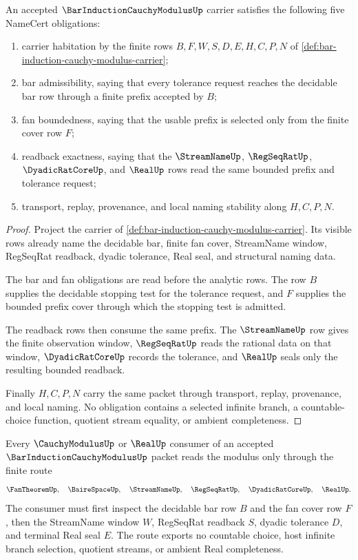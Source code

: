 \begin{theorem}
\label{thm:bar-induction-cauchy-modulus-obligations}
An accepted $\BarInductionCauchyModulusUp$ carrier satisfies the following five NameCert obligations:
\begin{enumerate}
\item carrier habitation by the finite rows $B,F,W,S,D,E,H,C,P,N$ of \autoref{def:bar-induction-cauchy-modulus-carrier};
\item bar admissibility, saying that every tolerance request reaches the decidable bar row through a finite prefix accepted by $B$;
\item fan boundedness, saying that the usable prefix is selected only from the finite cover row $F$;
\item readback exactness, saying that the $\StreamNameUp$, $\RegSeqRatUp$, $\DyadicRatCoreUp$, and $\RealUp$ rows read the same bounded prefix and tolerance request;
\item transport, replay, provenance, and local naming stability along $H,C,P,N$.
\end{enumerate}
\end{theorem}

\begin{proof}
Project the carrier of \autoref{def:bar-induction-cauchy-modulus-carrier}. Its visible rows already name the decidable bar, finite fan cover, StreamName window, RegSeqRat readback, dyadic tolerance, Real seal, and structural naming data.

The bar and fan obligations are read before the analytic rows. The row $B$ supplies the decidable stopping test for the tolerance request, and $F$ supplies the bounded prefix cover through which the stopping test is admitted.

The readback rows then consume the same prefix. The $\StreamNameUp$ row gives the finite observation window, $\RegSeqRatUp$ reads the rational data on that window, $\DyadicRatCoreUp$ records the tolerance, and $\RealUp$ seals only the resulting bounded readback.

Finally $H,C,P,N$ carry the same packet through transport, replay, provenance, and local naming. No obligation contains a selected infinite branch, a countable-choice function, quotient stream equality, or ambient completeness.
\end{proof}

\begin{theorem}
\label{thm:bar-induction-cauchy-modulus-fan-handoff}
Every $\CauchyModulusUp$ or $\RealUp$ consumer of an accepted $\BarInductionCauchyModulusUp$ packet reads the modulus only through the finite route
$$
\FanTheoremUp,\quad
\BaireSpaceUp,\quad
\StreamNameUp,\quad
\RegSeqRatUp,\quad
\DyadicRatCoreUp,\quad
\RealUp .
$$
The consumer must first inspect the decidable bar row $B$ and the fan cover row $F$, then the StreamName window $W$, RegSeqRat readback $S$, dyadic tolerance $D$, and terminal Real seal $E$. The route exports no countable choice, host infinite branch selection, quotient streams, or ambient Real completeness.
\end{theorem}

